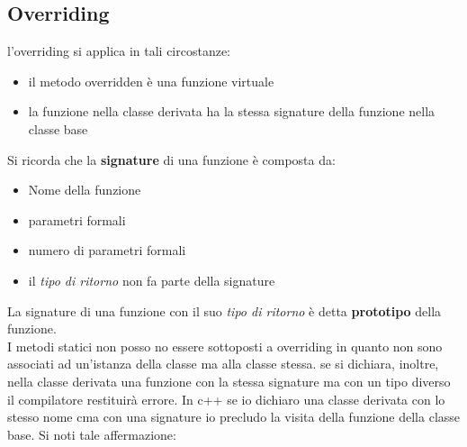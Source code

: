 \documentclass{report}
\begin{document}
\subsection{Overriding}

l'overriding si applica in tali circostanze:
\begin{itemize}
    \item il metodo overridden è una funzione virtuale
    \item la funzione nella classe derivata ha la stessa signature della funzione nella classe base
\end{itemize}

Si ricorda che la \textbf{signature} di una funzione è composta da:
\begin{itemize}
    \item Nome della funzione
    \item parametri formali
    \item numero di parametri formali
    \item il \textit{tipo di ritorno} non fa parte della signature
\end{itemize}

La signature di una funzione con il suo \textit{tipo di ritorno} è detta \textbf{prototipo} della funzione. \\
I metodi statici non posso no essere sottoposti a overriding in quanto non sono associati ad un'istanza della classe ma alla classe stessa. se si dichiara, inoltre, nella classe derivata una funzione con la stessa signature ma con un tipo diverso il compilatore restituirà errore. In c++ se io dichiaro una classe derivata con lo stesso nome cma con una signature io precludo la visita della funzione della classe base. Si noti tale affermazione:


\end{document}
